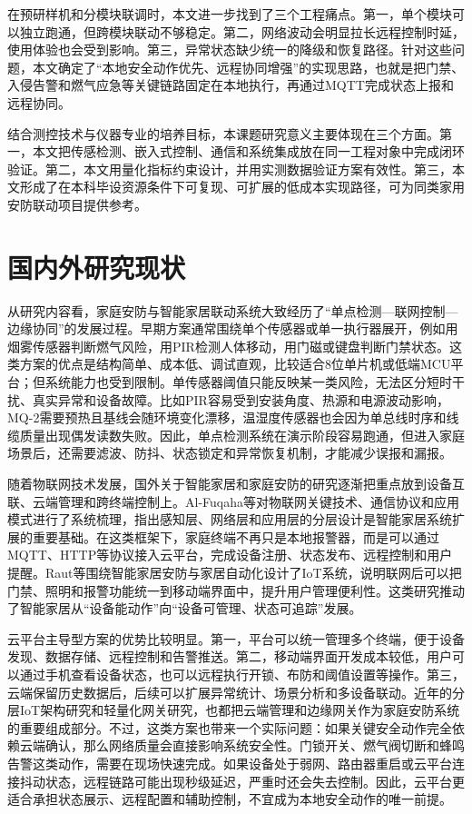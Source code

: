 \documentclass[UTF8,12pt,a4paper,oneside]{ctexbook}
\numberwithin{equation}{chapter}
\let\cite\supercite
\begin{document}
在预研样机和分模块联调时，本文进一步找到了三个工程痛点。第一，单个模块可以独立跑通，但跨模块联动不够稳定。第二，网络波动会明显拉长远程控制时延，使用体验也会受到影响。第三，异常状态缺少统一的降级和恢复路径。针对这些问题，本文确定了“本地安全动作优先、远程协同增强”的实现思路，也就是把门禁、入侵告警和燃气应急等关键链路固定在本地执行，再通过MQTT完成状态上报和远程协同。

结合测控技术与仪器专业的培养目标，本课题研究意义主要体现在三个方面。第一，本文把传感检测、嵌入式控制、通信和系统集成放在同一工程对象中完成闭环验证。第二，本文用量化指标约束设计，并用实测数据验证方案有效性。第三，本文形成了在本科毕设资源条件下可复现、可扩展的低成本实现路径，可为同类家用安防联动项目提供参考。
\section{国内外研究现状}
从研究内容看，家庭安防与智能家居联动系统大致经历了“单点检测—联网控制—边缘协同”的发展过程。早期方案通常围绕单个传感器或单一执行器展开，例如用烟雾传感器判断燃气风险，用PIR检测人体移动，用门磁或键盘判断门禁状态。这类方案的优点是结构简单、成本低、调试直观，比较适合8位单片机或低端MCU平台；但系统能力也受到限制。单传感器阈值只能反映某一类风险，无法区分短时干扰、真实异常和设备故障。比如PIR容易受到安装角度、热源和电源波动影响，MQ-2需要预热且基线会随环境变化漂移，温湿度传感器也会因为单总线时序和线缆质量出现偶发读数失败。因此，单点检测系统在演示阶段容易跑通，但进入家庭场景后，还需要滤波、防抖、状态锁定和异常恢复机制，才能减少误报和漏报。

随着物联网技术发展，国外关于智能家居和家庭安防的研究逐渐把重点放到设备互联、云端管理和跨终端控制上。Al-Fuqaha等对物联网关键技术、通信协议和应用模式进行了系统梳理，指出感知层、网络层和应用层的分层设计是智能家居系统扩展的重要基础\cite{smart_home_survey_2017}。在这类框架下，家庭终端不再只是本地报警器，而是可以通过MQTT、HTTP等协议接入云平台，完成设备注册、状态发布、远程控制和用户提醒。Raut等围绕智能家居安防与家居自动化设计了IoT系统，说明联网后可以把门禁、照明和报警功能统一到移动端界面中，提升用户管理便利性\cite{home_security_iot_2020}。这类研究推动了智能家居从“设备能动作”向“设备可管理、状态可追踪”发展。

云平台主导型方案的优势比较明显。第一，平台可以统一管理多个终端，便于设备发现、数据存储、远程控制和告警推送。第二，移动端界面开发成本较低，用户可以通过手机查看设备状态，也可以远程执行开锁、布防和阈值设置等操作。第三，云端保留历史数据后，后续可以扩展异常统计、场景分析和多设备联动。近年的分层IoT架构研究和轻量化网关研究，也都把云端管理和边缘网关作为家庭安防系统的重要组成部分\cite{bozorgi2026_iot_arch,serepas2025_gateway}。不过，这类方案也带来一个实际问题：如果关键安全动作完全依赖云端确认，那么网络质量会直接影响系统安全性。门锁开关、燃气阀切断和蜂鸣告警这类动作，需要在现场快速完成。如果设备处于弱网、路由器重启或云平台连接抖动状态，远程链路可能出现秒级延迟，严重时还会失去控制。因此，云平台更适合承担状态展示、远程配置和辅助控制，不宜成为本地安全动作的唯一前提。
\end{document}
